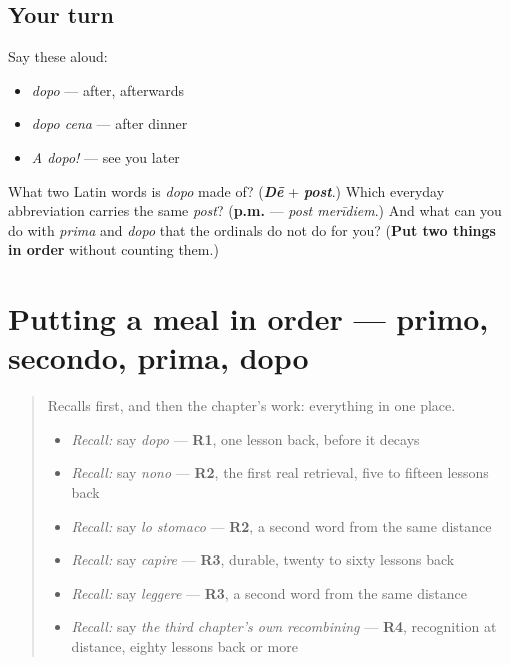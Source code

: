 \subsection*{Your turn}
Say these aloud:

\begin{itemize}
\raggedright
  \item \emph{dopo} — after, afterwards
  \item \emph{dopo cena} — after dinner
  \item \emph{A dopo!} — see you later
\end{itemize}

\begin{tcolorbox}[breakable,colback=teal!4,colframe=teal!35!black,title={Before you move on}]
What two Latin words is \emph{dopo} made of? (\emph{\textbf{Dē}} + \emph{\textbf{post}}.) Which everyday abbreviation carries the same \emph{post}? (\textbf{p.m.} — \emph{post merīdiem}.) And what can you do with \emph{prima} and \emph{dopo} that the ordinals do not do for you? (\textbf{Put two things in order} without counting them.)
\end{tcolorbox}
\section[prima il primo, dopo il secondo]{Putting a meal in order — primo, secondo, prima, dopo}

\label{lesson:IT-C28-practice}



\begin{quote}
Recalls first, and then the chapter's work: everything in one place.

\begin{itemize}
\raggedright
  \item \emph{Recall:} say \emph{dopo} — \textbf{R1}, one lesson back, before it decays
  \item \emph{Recall:} say \emph{nono} — \textbf{R2}, the first real retrieval, five to fifteen lessons back
  \item \emph{Recall:} say \emph{lo stomaco} — \textbf{R2}, a second word from the same distance
  \item \emph{Recall:} say \emph{capire} — \textbf{R3}, durable, twenty to sixty lessons back
  \item \emph{Recall:} say \emph{leggere} — \textbf{R3}, a second word from the same distance
  \item \emph{Recall:} say \emph{the third chapter's own recombining} — \textbf{R4}, recognition at distance, eighty lessons back or more
\end{itemize}
\end{quote}

